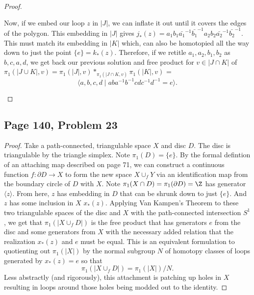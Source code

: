 \begin{proof}
\begin{enumerate}[label = (\alph*)]
        Now, if we embed our loop $z$ in $|J|$, we can inflate it out until it covers the edges of the polygon. This embedding in $|J|$ gives $j_*(z) = a_1b_1\bar{a_1}^{-1}\bar{b_1}^{-1}a_2b_2\bar{a_2}^{-1}\bar{b_2}^{-1}$. This must match its embedding in $|K|$ which, can also be homotopied all the way down to just the point $\{e\} = k_*(z)$. Therefore, if we retitle $a_1,a_2,b_1,b_2$ as $b,c,a,d$, we get back our previous solution and free product for $v \in |J \cap K|$ of $\pi_1(|J\cup K|, v) = \pi_1(|J|,v) *_{\pi_1(|J\cap K,v)}\pi_1(|K|,v)$ = $$\langle a,b,c,d \mid aba^{-1}b^{-1}cdc^{-1}d^{-1} = e \rangle.$$
    \end{enumerate}
\end{proof}

\subsection*{Page 140, Problem 23}
\vspace{15pt}
\begin{proof}
    \vspace{-10pt}
    Take a path-connected, triangulable space $X$ and disc $D$. The disc is triangulable by the triangle simplex. Note $\pi_1(D) = \{e\}.$ By the formal defintion of an attaching map described on page 71, we can construct a continuous function $f\colon \partial D \to X$ to form the new space $X \cup_f Y$ via an identification map from the boundary circle of $D$ with $X$. Note $\pi_1(X \cap D) = \pi_1(\partial D) = \Z$ has generator $\langle z \rangle$. From here, $z$ has embedding in $D$ that can be shrunk down to just $\{e\}$. And $z$ has some inclusion in $X$ $x_*(z)$. Applying Van Kampen's Theorem to these two triangulable spaces of the disc and $X$ with the path-connected intersection $S^1$, we get that $\pi_1(|X\cup_f D|)$ is the free product that has generators $e$ from the disc and some generators from $X$ with the necessary added relation that the realization $x_*(z)$ and $e$ must be equal. This is an equivalent formulation to quotienting out $\pi_1(|X|)$ by the normal subgroup $N$ of homotopy classes of loops generated by $x_*(z) = e$ so that $$\pi_1(|X\cup_fD|) = \pi_1(|X|)/N.$$ Less abstractly (and rigorously), this attachment is patching up holes in $X$ resulting in loops around those holes being modded out to the identity. 
\end{proof}

\newpage
